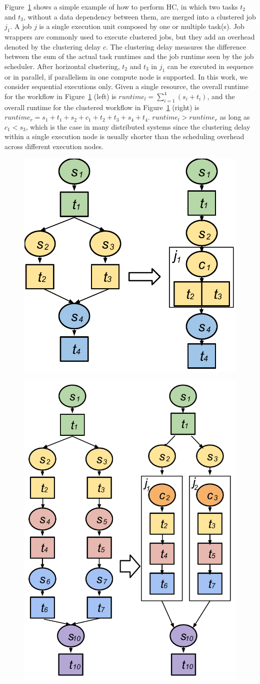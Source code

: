 \documentclass{IOS-Book-Article}
\begin{document}
Figure~\ref{fig:model_hc} shows a simple example of how to perform HC, in which two tasks $t_2$ and $t_3$, without a data dependency between them, are merged into a clustered job $j_1$. A job $j$ is a single execution unit composed by one or multiple task(s). Job wrappers are commonly used to execute clustered jobs, but they add an overhead denoted by the clustering delay $c$. The clustering delay measures the difference between the sum of the actual task runtimes and the job runtime seen by the job scheduler. 
After horizontal clustering, $t_2$ and $t_3$ in $j_1$ can be executed in sequence or in parallel, if parallelism in one compute node is supported. In this work, we consider sequential executions only. Given a single resource, the overall runtime for the workflow in Figure~\ref{fig:model_hc} (left) is $runtime_l= \sum_{i=1}^{4}(s_i+t_i)$, and the overall runtime for the clustered workflow in Figure~\ref{fig:model_hc} (right) is $runtime_r=s_1+t_1+s_2+c_1+t_2+t_3+s_4+t_4$.  $runtime_l > runtime_r$ as long as $c_1 < s_3$, which is the case in many distributed systems since the clustering delay within a single execution node is usually shorter than the scheduling overhead across different execution nodes. 

\begin{figure}[!htb]
\centering
 \includegraphics[width=0.45\linewidth]{hc.pdf}
  \label{fig:model_hc}
\end{figure}

\begin{figure}[!htb]
\centering
 \includegraphics[width=0.5\linewidth]{vc.pdf}
  \label{fig:model_vc}
\end{figure}
\end{document}

